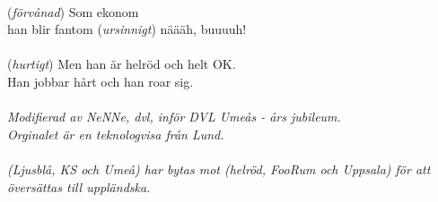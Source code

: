\\
(\textit{förvånad}) Som ekonom\\
han blir fantom (\textit{ursinnigt}) näääh, buuuuh!\\
\\
(\textit{hurtigt}) \revrpt Men han är helröd och helt OK.\\
Han jobbar hårt och han roar sig.\rpt\\
\\
{\footnotesize\textit{Modifierad av NeNNe, dvl, inför
    DVL Umeås  - års jubileum.\\ Orginalet är en
    teknologvisa från Lund.\\\\ (Ljusblå, KS och Umeå) har bytas mot
    (helröd, FooRum och Uppsala) för att översättas till uppländska.}}
